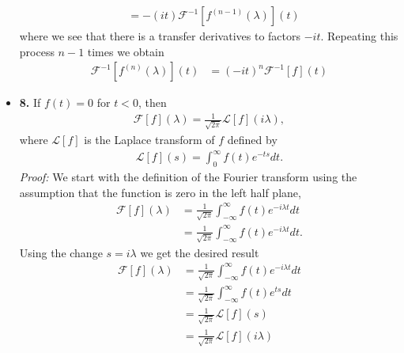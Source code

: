 \begin{questions}
\begin{solution}
\begin{itemize}
\begin{align*}
&=-(it)\mathcal{F}^{-1}[f^{(n-1)}(\lambda)](t)
\end{align*}
where we see that there is a transfer derivatives to factors $-it$. Repeating this process $n-1$ times we obtain
\begin{align*}
\mathcal{F}^{-1}[f^{(n)}(\lambda)](t)&=(-it)^n\mathcal{F}^{-1}[f](t)
\end{align*}
\item \textbf{8.} If $f(t)=0$ for $t<0$, then
\begin{align*}
\mathcal{F}[f](\lambda)=\frac{1}{\sqrt{2\pi}}\mathcal{L}[f](i\lambda),
\end{align*}
where $\mathcal{L}[f]$ is the Laplace transform of $f$ defined by
\begin{align*}
\mathcal{L}[f](s)=\int_{0}^{\infty}f(t)e^{-ts}dt.
\end{align*}
\textit{Proof:}
We start with the definition of the Fourier transform using the assumption that the function is zero in the left half plane,
\begin{align*}
\mathcal{F}[f](\lambda)&=\frac{1}{\sqrt{2\pi}}\int_{-\infty}^{\infty}f(t)e^{-i\lambda t}dt\\
&=\frac{1}{\sqrt{2\pi}}\int_{-\infty}^{\infty}f(t)e^{-i\lambda t}dt.
\end{align*}
Using the change $s=i\lambda$ we get the desired result
\begin{align*}
\mathcal{F}[f](\lambda)&=\frac{1}{\sqrt{2\pi}}\int_{-\infty}^{\infty}f(t)e^{-i\lambda t}dt\\
&=\frac{1}{\sqrt{2\pi}}\int_{-\infty}^{\infty}f(t)e^{ts}dt\\
&=\frac{1}{\sqrt{2\pi}}\mathcal{L}[f](s)\\
&=\frac{1}{\sqrt{2\pi}}\mathcal{L}[f](i\lambda)\\
\end{align*}
\end{itemize}
\end{solution}
\end{questions}
